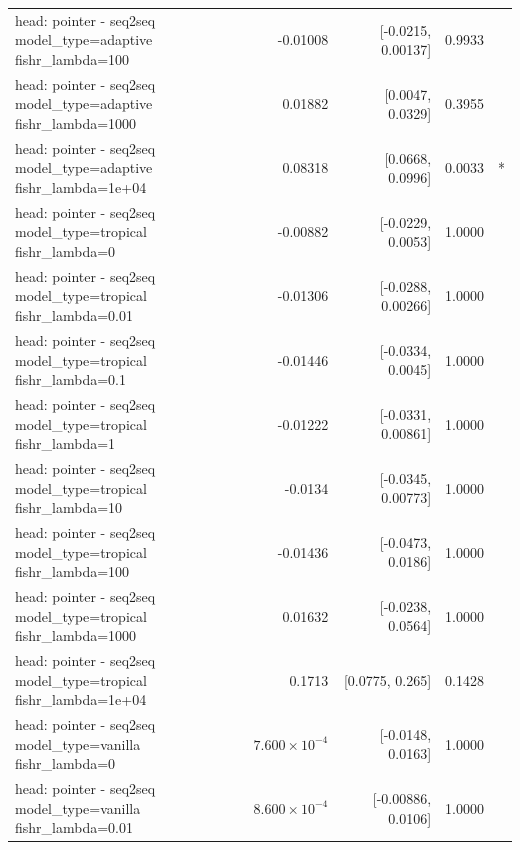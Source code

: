 \documentclass[10pt]{article}
\makeatletter
\newcommand{\stackcell}[1]{\begin{tabular}[t]{@{}l@{}}#1\end{tabular}}
\makeatother
\begin{document}
{\begin{longtable}{lrrrl}
\stackcell{head: pointer - seq2seq\\\footnotesize model\_type=adaptive fishr\_lambda=100 } & -0.01008 & [-0.0215, 0.00137] & 0.9933 & \\
\stackcell{head: pointer - seq2seq\\\footnotesize model\_type=adaptive fishr\_lambda=1000 } & 0.01882 & [0.0047, 0.0329] & 0.3955 & \\
\stackcell{head: pointer - seq2seq\\\footnotesize model\_type=adaptive fishr\_lambda=1e+04 } & 0.08318 & [0.0668, 0.0996] & 0.0033 & *\\
\stackcell{head: pointer - seq2seq\\\footnotesize model\_type=tropical fishr\_lambda=0 } & -0.00882 & [-0.0229, 0.0053] & 1.0000 & \\
\stackcell{head: pointer - seq2seq\\\footnotesize model\_type=tropical fishr\_lambda=0.01 } & -0.01306 & [-0.0288, 0.00266] & 1.0000 & \\
\stackcell{head: pointer - seq2seq\\\footnotesize model\_type=tropical fishr\_lambda=0.1 } & -0.01446 & [-0.0334, 0.0045] & 1.0000 & \\
\stackcell{head: pointer - seq2seq\\\footnotesize model\_type=tropical fishr\_lambda=1 } & -0.01222 & [-0.0331, 0.00861] & 1.0000 & \\
\stackcell{head: pointer - seq2seq\\\footnotesize model\_type=tropical fishr\_lambda=10 } & -0.0134 & [-0.0345, 0.00773] & 1.0000 & \\
\stackcell{head: pointer - seq2seq\\\footnotesize model\_type=tropical fishr\_lambda=100 } & -0.01436 & [-0.0473, 0.0186] & 1.0000 & \\
\stackcell{head: pointer - seq2seq\\\footnotesize model\_type=tropical fishr\_lambda=1000 } & 0.01632 & [-0.0238, 0.0564] & 1.0000 & \\
\stackcell{head: pointer - seq2seq\\\footnotesize model\_type=tropical fishr\_lambda=1e+04 } & 0.1713 & [0.0775, 0.265] & 0.1428 & \\
\stackcell{head: pointer - seq2seq\\\footnotesize model\_type=vanilla fishr\_lambda=0 } & $7.600\times10^{-4}$ & [-0.0148, 0.0163] & 1.0000 & \\
\stackcell{head: pointer - seq2seq\\\footnotesize model\_type=vanilla fishr\_lambda=0.01 } & $8.600\times10^{-4}$ & [-0.00886, 0.0106] & 1.0000 & \\

\end{longtable}}
\end{document}
